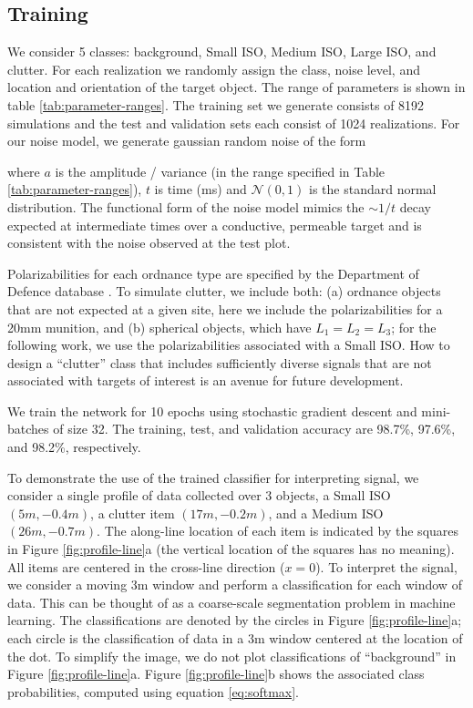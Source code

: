 \documentclass{segabs}
\begin{document}
\subsection{Training}

We consider 5 classes: background, Small ISO, Medium ISO, Large ISO, and clutter. For each realization we randomly assign the class, noise level, and location and orientation of the target object. The range of parameters is shown in table \ref{tab:parameter-ranges}. The training set we generate consists of 8192 simulations and the test and validation sets each consist of 1024 realizations. For our noise model, we generate gaussian random noise of the form

where $a$ is the amplitude / variance (in the range specified in Table \ref{tab:parameter-ranges}), $t$ is time (ms) and $\mathcal{N}(0, 1)$ is the standard normal distribution. The functional form of the noise model mimics the $\sim 1/t$ decay expected at intermediate times over a conductive, permeable target \citep{Pasion1999} and is consistent with the noise observed at the test plot.

Polarizabilities for each ordnance type are specified by the Department of Defence database \citep{Murray2016}. To simulate clutter, we include both: (a) ordnance objects that are not expected at a given site, here we include the polarizabilities for a 20mm munition, and (b) spherical objects, which have $L_1 = L_2 = L_3$; for the following work, we use the polarizabilities associated with a Small ISO. How to design a ``clutter'' class that includes sufficiently diverse signals that are not associated with targets of interest is an avenue for future development.

We train the network for 10 epochs using stochastic gradient descent and mini-batches of size 32. The training, test, and validation accuracy are 98.7\%, 97.6\%, and 98.2\%, respectively.

To demonstrate the use of the trained classifier for interpreting signal, we consider a single profile of data collected over 3 objects, a Small ISO $(5m, -0.4m)$, a clutter item $(17m, -0.2m)$, and a Medium ISO $(26m, -0.7m)$. The along-line location of each item is indicated by the squares in Figure \ref{fig:profile-line}a (the vertical location of the squares has no meaning). All items are centered in the cross-line direction ($x=0$). To interpret the signal, we consider a moving 3m window and perform a classification for each window of data. This can be thought of as a coarse-scale segmentation problem in machine learning. The classifications are denoted by the circles in Figure \ref{fig:profile-line}a; each circle is the classification of data in a 3m window centered at the location of the dot. To simplify the image, we do not plot classifications of ``background'' in Figure \ref{fig:profile-line}a. Figure \ref{fig:profile-line}b shows the associated class probabilities, computed using equation \ref{eq:softmax}.
\end{document}
